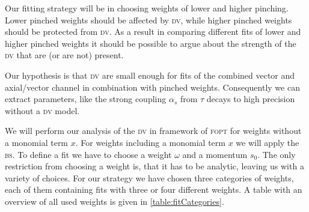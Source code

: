 \documentclass[../../index.tex]{subfiles}
\begin{document}
Our fitting strategy will be in choosing weights of lower and higher pinching.
Lower pinched weights should be affected by \textsc{dv}, while higher pinched
weights should be protected from \textsc{dv}. As a result in comparing different
fits of lower and higher pinched weights it should be possible to argue about
the strength of the \textsc{dv} that are (or are not) present.

Our hypothesis is that \textsc{dv} are small enough for fits of the combined
vector and axial\-/vector channel in combination with pinched weights.
Consequently we can extract parameters, like the strong coupling \(\alpha_s\)
from \(\tau\) decays to high precision without a \textsc{dv} model.

We will perform our analysis of the \textsc{dv} in framework of \textsc{fopt}
for weights without a monomial term \(x\). For weights including a monomial term
\(x\) we will apply the \textsc{bs}. To define a fit we have to choose a weight
\(\omega\) and a momentum \(s_0\). The only restriction from choosing a weight
is, that it has to be analytic, leaving us with a variety of choices. For our
strategy we have chosen three categories of weights, each of them containing
fits with three or four different weights. A table with an overview of all used
weights is given in \cref{table:fitCategories}.
\end{document}
